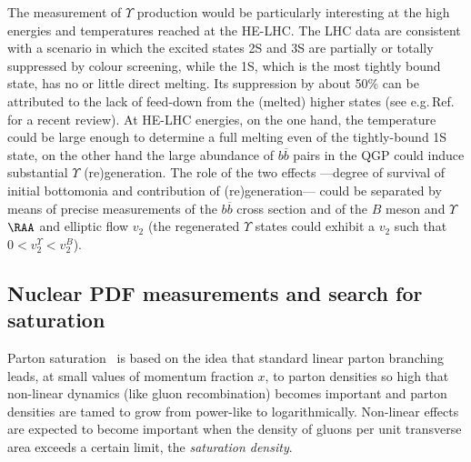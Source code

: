 \documentclass[../report.tex]{subfiles}
\begin{document}
The measurement of $\Upsilon$ production would be particularly interesting
at the high
energies and temperatures reached at the HE-LHC.
The LHC data are consistent with a scenario in which the excited
states 2S and 3S are partially or totally suppressed by colour
screening, while the 1S, which is the most tightly bound state, has no
or little direct melting. Its suppression by about 50\% can be
attributed to the lack of feed-down from the (melted) higher states
(see e.g.\,Ref.~\cite{Andronic:2015wma} for a recent review).
At HE-LHC energies, on the one hand, the temperature could be large
enough to determine a full melting even of the tightly-bound 1S state,
on the other hand the large abundance of $b\overline b$ pairs in the
QGP could induce substantial $\Upsilon$ (re)generation.
The role of the two effects ---degree of survival of initial bottomonia and contribution of
(re)generation--- could be separated by means of precise measurements of
the $b\overline b$ cross section
and of the $B$ meson and $\Upsilon$ $\RAA$ and elliptic flow $v_2$ 
(the regenerated $\Upsilon$ states could exhibit a $v_2$ such that $0<v_2^{\Upsilon}<v_2^B$).

  
\subsection{Nuclear PDF measurements and search for saturation}
\label{sec:HE_smallx}

\newcommand{\pizero}{\ensuremath{\pi^{0}}}
\newcommand{\ptjet}{\ensuremath{p_\mathrm{T,jet}}}



Parton saturation~\cite{Gribov:1984tu,Mueller:1985wy} is based on the idea that standard linear parton branching  leads, at small values of momentum fraction $x$, to parton densities so high that non-linear dynamics (like gluon recombination) becomes important and parton densities are tamed to grow from power-like to logarithmically. Non-linear effects are expected to become important when the density of gluons per unit transverse area exceeds a certain limit, the \textit{saturation density}. 
\end{document}
